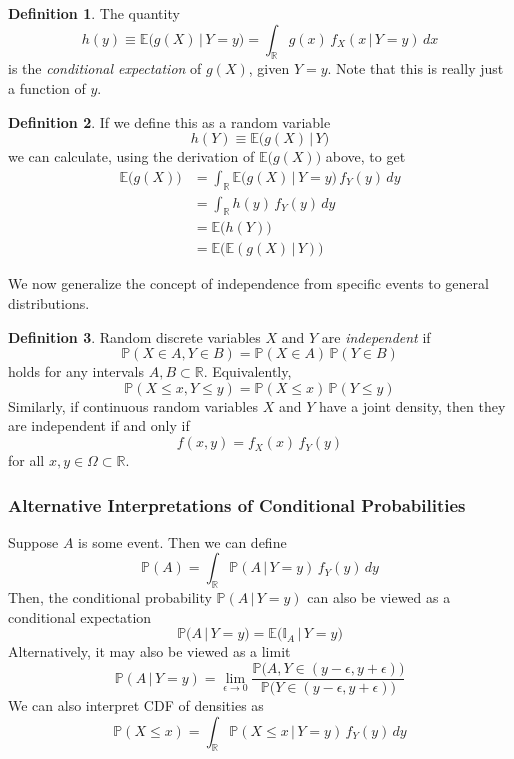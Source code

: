 \documentclass{article}
\theoremstyle{remark}
\theoremstyle{definition}
\newtheorem{definition}{Definition}[section]
\begin{document}
\begin{definition}
The quantity
\[h(y) \equiv \mathbb{E} \big( g(X) \, | \, Y=y\big) = \int_\mathbb{R} g(x) \, f_X (x\,|\, Y=y) \, dx\]
is the \textit{conditional expectation} of $g(X)$, given $Y = y$. Note that this is really just a function of $y$. 
\end{definition}

\begin{definition}
If we define this as a random variable 
\[h(Y) \equiv \mathbb{E} \big( g(X) \,|\,Y\big)\]
we can calculate, using the derivation of $\mathbb{E}\big(g(X)\big)$ above, to get
\begin{align*}
    \mathbb{E}\big(g(X)\big) & = \int_\mathbb{R} \mathbb{E} \big( g(X) \, | \, Y = y \big) \, f_Y (y) \, dy \\
    & = \int_\mathbb{R} h(y) \, f_Y (y) \, dy  \\
    & = \mathbb{E}\big(h(Y)\big) \\
    & = \mathbb{E} \big( \mathbb{E}(g(X) \, | \, Y ) \big) 
\end{align*}
\end{definition}

We now generalize the concept of independence from specific events to general distributions. 
\begin{definition}
Random discrete variables $X$ and $Y$ are \textit{independent} if 
\[\mathbb{P}(X \in A, Y \in B) = \mathbb{P}(X \in A) \, \mathbb{P}(Y \in B)\]
holds for any intervals $A, B \subset \mathbb{R}$. Equivalently, 
\[\mathbb{P}(X \leq x, Y \leq y) = \mathbb{P}(X \leq x) \, \mathbb{P}(Y \leq y)\]
Similarly, if continuous random variables $X$ and $Y$ have a joint density, then they are independent if and only if 
\[f(x, y) = f_X (x) \, f_Y (y)\]
for all $x, y \in \Omega \subset \mathbb{R}$. 
\end{definition}

\subsubsection{Alternative Interpretations of Conditional Probabilities}
Suppose $A$ is some event. Then we can define
\[\mathbb{P}(A) = \int_\mathbb{R} \mathbb{P}(A \,|\, Y = y) \, f_Y (y) \, dy\]
Then, the conditional probability $\mathbb{P}(A\,|\,Y=y)$ can also be viewed as a conditional expectation
\[\mathbb{P}(A\,|\,Y = y) = \mathbb{E} \big( \mathbb{I}_A \,|\, Y =y \big)\]
Alternatively, it may also be viewed as a limit
\[\mathbb{P}(A\,|\,Y = y) = \lim_{\epsilon \rightarrow 0} \frac{\mathbb{P}\big(A, Y \in (y - \epsilon, y + \epsilon)\big)}{\mathbb{P}\big(Y \in (y-\epsilon, y+\epsilon)\big)}\]
We can also interpret CDF of densities as 
\[\mathbb{P}(X \leq x) = \int_\mathbb{R} \mathbb{P}(X \leq x \,|\, Y = y) \, f_Y (y) \, dy\]
\end{document}
